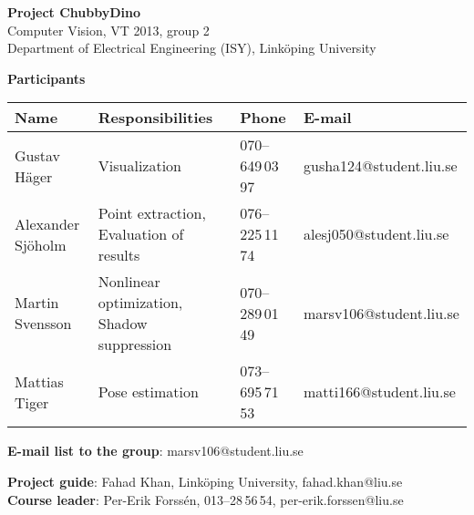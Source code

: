 \begin{center}
    \vspace*{4\baselineskip}

	\textbf{\huge Project ChubbyDino} \\
	\vspace*{0.5\baselineskip}
	Computer Vision, VT 2013, group 2 \\
	Department of Electrical Engineering (ISY), Link\"{o}ping University
	
	\vspace*{2\baselineskip}
	\textbf{\LARGE Participants}


	{\footnotesize 
	\begin{tabular}{|p{2.7cm}|p{5cm}|p{2cm}|p{3.4cm}|}
		\hline
			\textbf{Name} & \textbf{Responsibilities} & \textbf{Phone} & \textbf{E-mail} \\
		\hline
		Gustav Häger & Visualization & 070--649\,03\,97 & gusha124@student.liu.se \\
		\hline
		Alexander Sjöholm & Point extraction, \newline Evaluation of results & 076--225\,11\,74 & alesj050@student.liu.se \\
		\hline
		Martin Svensson & Nonlinear optimization, \newline Shadow suppression & 070--289\,01\,49 & marsv106@student.liu.se \\
		\hline
		Mattias Tiger & Pose estimation & 073--695\,71\,53 & matti166@student.liu.se \\
		\hline
	\end{tabular}
	}

{\footnotesize 
\textbf{E-mail list to the group}: marsv106@student.liu.se \\
\vspace{1\baselineskip}

\textbf{Project guide}: Fahad Khan, Link\"{o}ping University, fahad.khan@liu.se \\
\textbf{Course leader}: Per-Erik Forssén, 013--28\,56\,54, per-erik.forssen@liu.se \\
}

\end{center}
